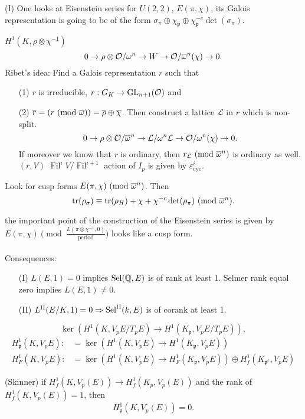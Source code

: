 \documentclass[12pt,amsfont]{amsart}
\begin{document}
(I) One looks at Eisenstein series for $U(2,2)$, $E(\pi, \chi)$, its Galois representation is going to be of the form $\sigma_\pi \oplus \chi_{\mathfrak{p}} \oplus \chi_{\mathfrak{p}}^{-c} \det(\sigma_\pi)$. 

\begin{rmk} $H^1(K, \rho \otimes \chi^{-1})$
$$\displaystyle 0 \rightarrow \rho \otimes \mathcal{O}/\omega^n \rightarrow W \rightarrow \mathcal{O}/\overline{\omega}^n (\chi) \rightarrow 0.$$
Ribet's idea: Find a Galois representation $r$ such that
\begin{enumerate}
\item[(1)]
$r$ is irreducible, $r: G_K \rightarrow \operatorname{GL}_{n+1}(\mathcal{O})$ and 
\item[(2)]
$\ol{r} = (r \pmod{\ol{\omega}}) = \ol{\rho} \oplus \ol{\chi}$. Then construct a lattice $\mathcal{L}$ in $r$ which is non-split.
\[
 0 \rightarrow \rho \otimes \mathcal{O}/ \overline{\omega}^n \rightarrow \mathcal{L}/\omega^n \mathcal{L} \rightarrow \mathcal{O}/\omega^n (\chi) \rightarrow 0.
 \]
If moreover we know that $r$ is ordinary, then $r_{\mathcal{L}} \pmod{\ol{\omega}^n}$ is ordinary as well. $(r,V)$ $\operatorname{Fil}^i V/\operatorname{Fil}^{i+1}$ action of $I_p$ is given by $\varepsilon_{\text{cyc}}^i$.  
\end{enumerate}
\end{rmk}

Look for cusp forms $E(\pi, \chi) \pmod{\ol{\omega}^n}$. Then
$$\displaystyle \operatorname{tr}(\rho_\sigma) \equiv \operatorname{tr}(\rho_H) + \chi + \chi^{-c} \det(\rho_\pi) \pmod{\ol{\omega}^n}.$$

the important point of the construction of the Eisenstein series is given by $E(\pi, \chi) \pmod{ \frac{L(\pi \otimes \chi^{-1}, 0)}{\text{period}}}$ looks like a cusp form. \\ \\
Consequences: 
\begin{enumerate}
\item[(I)]
$L(E,1) = 0$ implies $\operatorname{Sel}({\mathbb Q}, E)$ is of rank at least 1. Selmer rank equal zero implies $L(E,1) \ne 0$.
\item[(II)]
$L^{\textrm{II}}(E/K, 1) = 0 \Rightarrow \operatorname{Sel}^{\textrm{II}}(k, E)$ is of corank at least 1. 
\end{enumerate}
$$\displaystyle \ker(H^1(K, V_p E/T_p E) \rightarrow H^1(K_\mathfrak{p}, V_p E/T_p E)),$$
\begin{align*}
H_{\mathfrak{p}}^1(K, V_p E) :&= \ker(H^1(K,  V_p E) \rightarrow H^1(K_\mathfrak{p}, V_p E))\\
H_F^1(K, V_p E) :&= \ker(H^1(K, V_p E) \rightarrow H_F^1(K_\mathfrak{p}, V_p E)) \oplus H_f^1(K_{\mathfrak{p}^c}, V_p E)
\end{align*}
\begin{lem} (Skinner) if $H_f^1(K, V_p(E)) \rightarrow H_f^1(K_p, V_p(E))$ and the rank of $H_f^1(K, V_p(E)) = 1$, then 
$$\displaystyle H_{\mathfrak{p}}^1(K, V_p(E)) = 0.$$
\end{lem}
\end{document}
